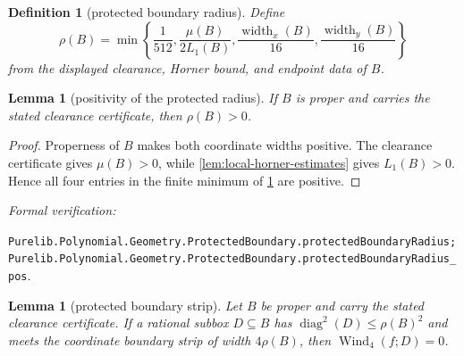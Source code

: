 \documentclass[11pt]{article}
\newtheorem{lemma}[theorem]{Lemma}
\newtheorem{definition}[theorem]{Definition}
\newcommand{\Wind}{\operatorname{Wind}}
\newcommand{\diamq}{\operatorname{diag}^{2}}
\newcommand{\leanref}[1]{\par\smallskip\noindent
  \emph{Formal verification:}\par\nobreak
  {\raggedright\nolinkurl{#1}.\par}}
\begin{document}
\begin{definition}[protected boundary radius]
\label{def:protected-boundary-radius}
Define
\[
 \rho(B)=\min\left\{\frac1{512},
       \frac{\mu(B)}{2L_1(B)},
       \frac{\operatorname{width}_x(B)}{16},
       \frac{\operatorname{width}_y(B)}{16}\right\}
\]
from the displayed clearance, Horner bound, and endpoint data of $B$.
\end{definition}

\begin{lemma}[positivity of the protected radius]
\label{lem:protected-radius-positive}
If $B$ is proper and carries the stated clearance certificate, then
$\rho(B)>0$.
\end{lemma}

\begin{proof}
Properness of $B$ makes both coordinate widths positive.  The clearance
certificate gives $\mu(B)>0$, while
\cref{lem:local-horner-estimates} gives $L_1(B)>0$.  Hence all four entries
in the finite minimum of \cref{def:protected-boundary-radius} are positive.
\end{proof}

\leanref{Purelib.Polynomial.Geometry.ProtectedBoundary.protectedBoundaryRadius;
Purelib.Polynomial.Geometry.ProtectedBoundary.protectedBoundaryRadius_pos}

\begin{lemma}[protected boundary strip]
\label{lem:protected-strip}
Let $B$ be proper and carry the stated clearance certificate.  If a rational
subbox $D\subseteq B$ has $\diamq(D)\le\rho(B)^2$ and meets the coordinate
boundary strip of width $4\rho(B)$, then $\Wind_4(f;D)=0$.
\end{lemma}
\end{document}
